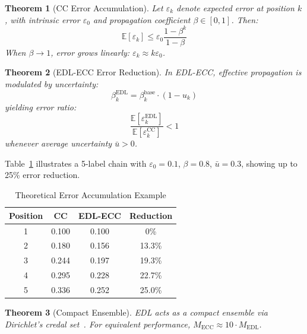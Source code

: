 \documentclass[conference]{IEEEtran}
\newtheorem{theorem}{Theorem}
\begin{document}
\begin{theorem}[CC Error Accumulation]
\label{thm:error_acc}
Let $\varepsilon_k$ denote expected error at position $k$, with intrinsic error $\varepsilon_0$ and propagation coefficient $\beta \in [0,1]$. Then:
\begin{equation}
\mathbb{E}[\varepsilon_k] \leq \varepsilon_0 \frac{1 - \beta^k}{1 - \beta}
\end{equation}
When $\beta \to 1$, error grows linearly: $\varepsilon_k \approx k \varepsilon_0$.
\end{theorem}

\begin{theorem}[EDL-ECC Error Reduction]
\label{thm:edl_reduction}
In EDL-ECC, effective propagation is modulated by uncertainty:
\begin{equation}
\beta_k^{\mathrm{EDL}} = \beta_k^{\mathrm{base}} \cdot (1 - u_k)
\end{equation}
yielding error ratio:
\begin{equation}
\frac{\mathbb{E}[\varepsilon_k^{\mathrm{EDL}}]}{\mathbb{E}[\varepsilon_k^{\mathrm{CC}}]} < 1
\end{equation}
whenever average uncertainty $\bar{u} > 0$.
\end{theorem}

Table~\ref{tab:error_theory} illustrates a 5-label chain with $\varepsilon_0=0.1$, $\beta=0.8$, $\bar{u}=0.3$, showing up to 25\% error reduction.

\begin{table}[t]
\centering
\caption{Theoretical Error Accumulation Example}
\label{tab:error_theory}
\small
\begin{tabular}{cccc}
\toprule
\textbf{Position} & \textbf{CC} & \textbf{EDL-ECC} & \textbf{Reduction} \\ 
\midrule
1 & 0.100 & 0.100 & 0\% \\
2 & 0.180 & 0.156 & 13.3\% \\
3 & 0.244 & 0.197 & 19.3\% \\
4 & 0.295 & 0.228 & 22.7\% \\
5 & 0.336 & 0.252 & 25.0\% \\
\bottomrule
\end{tabular}
\end{table}

\begin{theorem}[Compact Ensemble]
EDL acts as a compact ensemble via Dirichlet's credal set~\cite{josang2016subjective}. For equivalent performance, $M_{\mathrm{ECC}} \approx 10 \cdot M_{\mathrm{EDL}}$.
\end{theorem}
\end{document}
